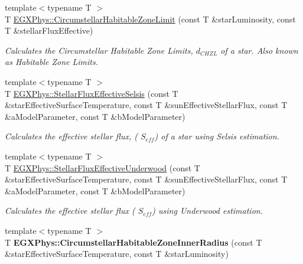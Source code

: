 \begin{DoxyCompactItemize}
\item 
{\footnotesize template$<$typename T $>$ }\\T \hyperlink{group___astrophysics_ga23a8f602461ea3257e8767b1d455c383}{E\+G\+X\+Phys\+::\+Circumstellar\+Habitable\+Zone\+Limit} (const T \&star\+Luminosity, const T \&stellar\+Flux\+Effective)
\begin{DoxyCompactList}\small\item\em Calculates the Circumstellar Habitable Zone Limits, $d_{CHZL}$ of a star. Also known as Habitable Zone Limits. \end{DoxyCompactList}\item 
{\footnotesize template$<$typename T $>$ }\\T \hyperlink{group___astrophysics_ga3ce3a04fec7b1c8fb66ac54270ce3902}{E\+G\+X\+Phys\+::\+Stellar\+Flux\+Effective\+Selsis} (const T \&star\+Effective\+Surface\+Temperature, const T \&sun\+Effective\+Stellar\+Flux, const T \&a\+Model\+Parameter, const T \&b\+Model\+Parameter)
\begin{DoxyCompactList}\small\item\em Calculates the effective stellar flux, ( $S_{eff}$) of a star using Selsis estimation. \end{DoxyCompactList}\item 
{\footnotesize template$<$typename T $>$ }\\T \hyperlink{group___astrophysics_ga34d1e39bce17904bc6d383f1935c79d6}{E\+G\+X\+Phys\+::\+Stellar\+Flux\+Effective\+Underwood} (const T \&star\+Effective\+Surface\+Temperature, const T \&sun\+Effective\+Stellar\+Flux, const T \&a\+Model\+Parameter, const T \&b\+Model\+Parameter)
\begin{DoxyCompactList}\small\item\em Calculates the effective stellar flux ( $S_{eff}$) using Underwood estimation. \end{DoxyCompactList}\item 
\mbox{\label{_circumstellar_habitable_zone_8inl_abcc7fdd3086efb4c0b786960a45c02e2}} 
{\footnotesize template$<$typename T $>$ }\\T {\bfseries E\+G\+X\+Phys\+::\+Circumstellar\+Habitable\+Zone\+Inner\+Radius} (const T \&star\+Effective\+Surface\+Temperature, const T \&star\+Luminosity)
\item 
\mbox{\label{_circumstellar_habitable_zone_8inl_ac6f89712c52ce26e1e2085fd85a914ea}} 

\end{DoxyCompactItemize}
